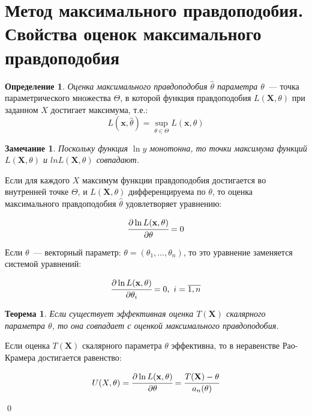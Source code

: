 \documentclass[oneside,final,14pt]{extreport}
\renewenvironment{proof}{{\bfseries Доказательство.}}{\qed}
\newtheorem{thm}{Теорема}[section]
\newtheorem*{rmrk}{Замечание}
\theoremstyle{definition}
\newtheorem{defn}{Определение}[section]
\begin{document}
\section{Метод максимального правдоподобия. Свойства оценок максимального правдоподобия}

\begin{defn}
{\it Оценка максимального правдоподобия $\hat{\theta}$ параметра $\theta$}~--- точка параметрического множества $\Theta$, в которой функция правдоподобия $L(\mathbf{X},\theta)$ при заданном $X$ достигает максимума, т.е.:
\begin{equation*}
    L(\boldsymbol{x}, \hat{\theta})=\sup _{\theta \in \Theta} L(\boldsymbol{x}, \theta)
\end{equation*}
\end{defn}

\begin{rmrk}
Поскольку функция $\operatorname{ln}y$ монотонна, то точки максимума функций $L(\mathbf{X},\theta)$ и $ln L(\mathbf{X},\theta)$ совпадают.
\end{rmrk}

Если для каждого $X$ максимум функции правдоподобия достигается во внутренней точке $\Theta$, и $L(\mathbf{X},\theta)$ дифференцируема по $\theta$, то оценка максимального правдоподобия $\hat{\theta}$ удовлетворяет уравнению:

\begin{equation*}
    \cfrac{\partial \ln L(\mathbf{x}, \theta)}{\partial \theta}=0
\end{equation*}

Если $\theta$~--- векторный параметр: $\theta=\left(\theta_{1}, \ldots, \theta_{n}\right)$, то это уравнение заменяется системой уравнений:

\begin{equation*}
    \cfrac{\partial \ln L(\mathbf{x}, \theta)}{\partial \theta_{i}}=0,~ i=\overline{1, n} 
\end{equation*}


\begin{thm}
Если существует эффективная оценка $T(\mathbf{X})$ скалярного параметра $\theta$, то она совпадает с оценкой максимального правдоподобия.
\end{thm}

\begin{proof}
Если оценка $T(\mathbf{X})$ скалярного параметра $\theta$ эффективна, то в неравенстве Рао-Крамера достигается равенство:

\begin{equation*}
    U(X,\theta) = \cfrac{\partial \ln L(\mathbf{x}, \theta)}{\partial \theta}=\cfrac{T(\mathbf{X})-\theta}{a_n(\theta)}
\end{equation*}

\end{proof}
\end{document}
